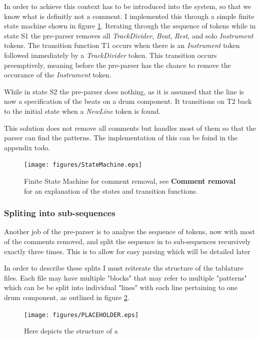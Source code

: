 \documentclass[12pt,twoside,notitlepage]{report}
\begin{document}
			In order to achieve this context has to be introduced into the system, so that we know what is definitly not a comment. I implemented this through a simple finite state machine shown in figure \ref{fsaf}. Iterating through the sequence of tokens while in state S1 the pre-parser removes all \emph{TrackDivider}, \emph{Beat}, \emph{Rest}, and solo \emph{Instrument} tokens. The transition function T1 occurs when there is an \emph{Instrument} token followed immediately by a \emph{TrackDivider} token. This transition occurs preemptively, meaning before the pre-parser has the chance to remove the occurance of the \emph{Instrument} token.
			
			While in state S2 the pre-parser does nothing, as it is assumed that the line is now a specification of the beats on a drum component. It transitions on T2 back to the initial state when a \emph{NewLine} token is found.
			
			This solution does not remove all comments but handles most of them so that the parser can find the patterns. The implementation of this can be foind in the appendix todo.
			\begin{figure}
			
				 
			\centerline{\texttt{[image: figures/StateMachine.eps]}} 
            \caption{\label{fsaf} Finite State Machine for comment removal, see \textbf{Comment removal} for an explanation of the states and transition functions.}                         
            \end{figure}
            
            \subsubsection{Spliting into sub-sequences}
            Another job of the pre-parser is to analyse the sequence of tokens, now with most of the comments removed, and split the sequence in to sub-sequences recursively exactly three times. This is to allow for easy parsing which will be detailed later
            
            In order to describe these splits I must reiterate the structure of the tablature files. Each file may have multiple "blocks" that may refer to multiple "patterns" which can be be split into individual "lines" with each line pertaining to one drum component, as outlined in figure \ref{fig:tabStruct}.
           
            
            \begin{figure}[h]
			\centerline{\texttt{[image: figures/PLACEHOLDER.eps]}}
			\caption{\label{fig:tabStruct} Here depicts the structure of a }
\end{figure}
\end{document}
